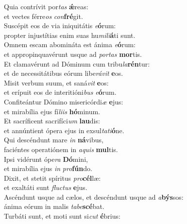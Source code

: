 \evenverse Quia contrívit por\textit{tas} \textbf{ǽ}reas:~\*\\
\evenverse et vectes férre\textit{os} \textit{con}\textbf{fré}git.\\
\oddverse Suscépit eos de via iniquitátis \textit{e}\textbf{ó}rum:~\*\\
\oddverse propter injustítias enim suas hu\textit{mi}\textit{li}\textbf{á}ti sunt.\\
\evenverse Omnem escam abomináta est ánima \textit{e}\textbf{ó}rum:~\*\\
\evenverse et appropinquavérunt usque ad \textit{por}\textit{tas} \textbf{mor}tis.\\
\oddverse Et clamavérunt ad Dóminum cum tribu\textit{la}\textbf{rén}tur:~\*\\
\oddverse et de necessitátibus eórum libe\textit{rá}\textit{vit} \textbf{e}os.\\
\evenverse Misit verbum suum, et saná\textit{vit} \textbf{e}os:~\*\\
\evenverse et erípuit eos de interitióni\textit{bus} \textit{e}\textbf{ó}rum.\\
\oddverse Confiteántur Dómino misericórdi\textit{æ} \textbf{e}jus:~\*\\
\oddverse et mirabília ejus fí\textit{li}\textit{is} \textbf{hó}minum.\\
\evenverse Et sacríficent sacrifíci\textit{um} \textbf{lau}dis:~\*\\
\evenverse et annúntient ópera ejus in exsul\textit{ta}\textit{ti}\textbf{ó}ne.\\
\oddverse Qui descéndunt mare \textit{in} \textbf{ná}vibus,~\*\\
\oddverse faciéntes operatiónem in \textit{a}\textit{quis} \textbf{mul}tis.\\
\evenverse Ipsi vidérunt ópe\textit{ra} \textbf{Dó}mini,~\*\\
\evenverse et mirabília ejus \textit{in} \textit{pro}\textbf{fún}do.\\
\oddverse Dixit, et stetit spíritus \textit{pro}\textbf{cél}læ:~\*\\
\oddverse et exaltáti sunt \textit{flu}\textit{ctus} \textbf{e}jus.\\
\evenverse Ascéndunt usque ad cælos, et descéndunt usque ad \textit{a}\textbf{býs}sos:~\*\\
\evenverse ánima eórum in malis \textit{ta}\textit{be}\textbf{scé}bat.\\
\oddverse Turbáti sunt, et moti sunt si\textit{cut} \textbf{é}brius:~\*\\

